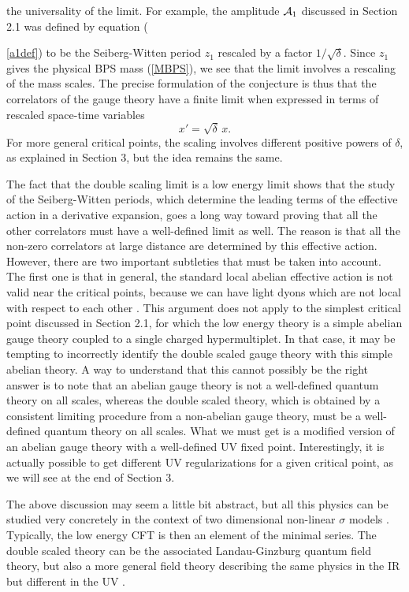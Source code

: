 \documentclass[a4paper,12pt]{article}
\begin{document}
the universality of the limit. For example, the amplitude ${\cal
A}_1$ discussed in Section 2.1 was defined by equation ({\ref{a1def})
to be the Seiberg-Witten period $z_1$
rescaled by a factor $1/\sqrt{\delta}$. Since $z_1$ gives the physical
BPS mass (\ref{MBPS}), we see that the limit involves a rescaling of the
mass scales. The precise formulation of the
conjecture is thus that the correlators of
the gauge theory have a finite limit when expressed in terms of rescaled
space-time variables
%
\begin{equation}
\label{xnew}
x' = \sqrt{\delta}\, x.
\end{equation}
%
For more general critical points, the scaling involves different
positive powers of $\delta$, as explained in Section 3, but the idea 
remains the same.

The fact that the double scaling limit is a low energy limit shows
that the study of the Seiberg-Witten periods, which determine the leading
terms of the effective action in a derivative expansion, goes a long way
toward proving that all the other correlators must have a well-defined
limit as well. The reason is that all the non-zero correlators at large
distance are determined by this effective action.  
However, there are two important subtleties that must be taken into 
account. The first one is that in general, the standard local abelian
effective action is not valid near the critical points, because we can 
have light dyons which are not local with respect to each other \cite{AD}.
This argument does not apply to
the simplest critical point discussed in Section 2.1, for which the low
energy theory is a simple abelian gauge theory coupled to a single
charged hypermultiplet. In that case, it may be tempting to incorrectly
identify the double scaled gauge theory with this simple abelian theory.
A way to understand that this cannot possibly be the right answer
is to note that an abelian gauge theory is not a well-defined quantum
theory on all scales, whereas the double scaled theory, which is obtained
by a consistent limiting procedure from a non-abelian gauge theory, must
be a well-defined quantum theory on all scales. What we must get is a
modified version of an abelian gauge theory with a well-defined UV fixed
point. Interestingly, it is actually possible to get different UV
regularizations for a given critical point, as we will see at the end of
Section 3. 

The above discussion may seem a little bit abstract, but all this
physics can be studied very concretely in the context of
two dimensional non-linear $\sigma$ models \cite{fer3}.
Typically, the low energy CFT is then an element of the minimal
series. The double scaled theory can be the associated
Landau-Ginzburg quantum field theory, but also a more general field
theory describing the same physics in the IR but different in the UV
\cite{fer3}.
%
}
\end{document}
